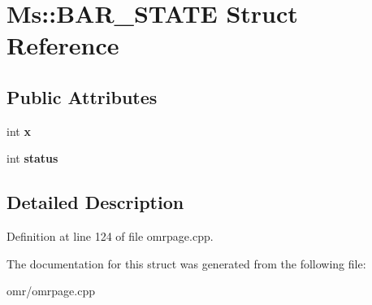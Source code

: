 \hypertarget{struct_ms_1_1_b_a_r___s_t_a_t_e}{}\section{Ms\+:\+:B\+A\+R\+\_\+\+S\+T\+A\+TE Struct Reference}
\label{struct_ms_1_1_b_a_r___s_t_a_t_e}
\subsection*{Public Attributes}
\begin{DoxyCompactItemize}
\item 
\mbox{\label{struct_ms_1_1_b_a_r___s_t_a_t_e_aff232d0b79486b5ab66d88f1ea3ca7f5}} 
int {\bfseries x}
\item 
\mbox{\label{struct_ms_1_1_b_a_r___s_t_a_t_e_a9c8bcb315b1d4abb6b791218e80f25cf}} 
int {\bfseries status}
\end{DoxyCompactItemize}


\subsection{Detailed Description}


Definition at line 124 of file omrpage.\+cpp.



The documentation for this struct was generated from the following file\+:\begin{DoxyCompactItemize}
\item 
omr/omrpage.\+cpp\end{DoxyCompactItemize}
